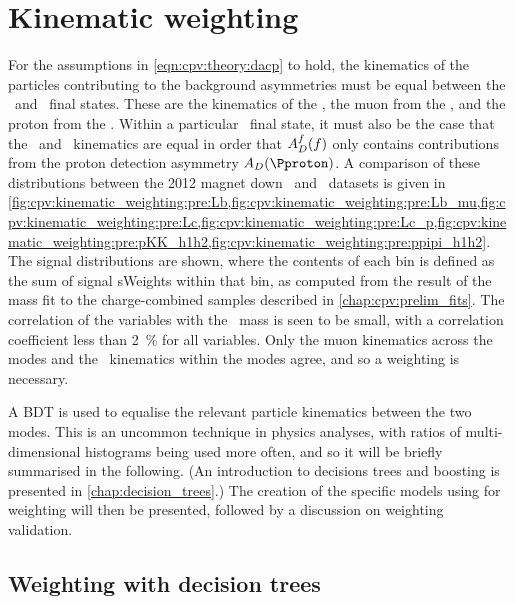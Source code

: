 \chapter{Kinematic weighting}
\label{chap:cpv:kinematic_weighting}

For the assumptions in \cref{eqn:cpv:theory:dacp} to hold, the
kinematics of the particles contributing to the background asymmetries must be
equal between the \pKK\ and \ppipi\ final states.
These are the kinematics of the \PLambdab, the muon from the \PLambdab, and the
proton from the \PLambdac.
Within a particular \phh\ final state, it must also be the case that the \Php\
and \Phm\ kinematics are equal in order that $A_{D}^{f}(f)$ only contains
contributions from the proton detection asymmetry $\AD(\Pproton)$.
A comparison of these distributions between the 2012 magnet down \pKK\ and
\ppipi\ datasets is given in
\cref{fig:cpv:kinematic_weighting:pre:Lb,fig:cpv:kinematic_weighting:pre:Lb_mu,fig:cpv:kinematic_weighting:pre:Lc,fig:cpv:kinematic_weighting:pre:Lc_p,fig:cpv:kinematic_weighting:pre:pKK_h1h2,fig:cpv:kinematic_weighting:pre:ppipi_h1h2}.
The signal distributions are shown, where the contents of each bin is defined
as the sum of signal sWeights within that bin, as computed from the result of
the mass fit to the charge-combined samples described in
\cref{chap:cpv:prelim_fits}.
The correlation of the variables with the \PLambdac\ mass is seen to be small,
with a correlation coefficient less than \SI{2}{\percent} for all variables.
Only the muon kinematics across the modes and the \hmhp\ kinematics within the
modes agree, and so a weighting is necessary.

A \acf{BDT} is used to equalise the relevant particle kinematics between the
two modes.
This is an uncommon technique in physics analyses, with ratios of
multi-dimensional histograms being used more often, and so it will be briefly
summarised in the following.
(An introduction to decisions trees and boosting is presented in
\cref{chap:decision_trees}.)
The creation of the specific models using for weighting will then be presented,
followed by a discussion on weighting validation.

\section{Weighting with decision trees}
\label{chap:cpv:kinematic_weighting:bdt_method}

